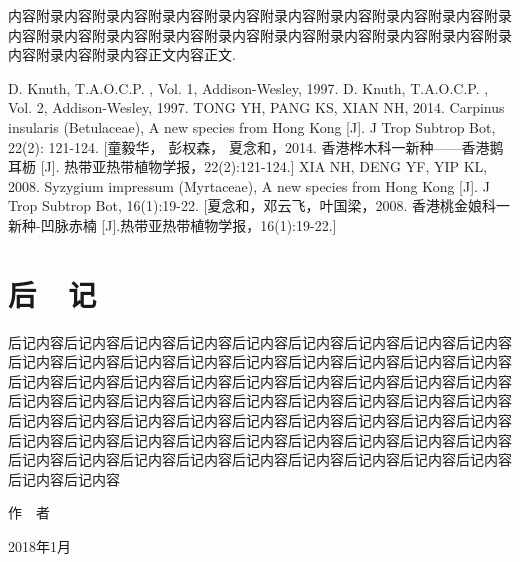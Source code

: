 \documentclass[utf8]{book}
\begin{document}
内容附录内容附录内容附录内容附录内容附录内容附录内容附录内容附录内容附录内容附录内容附录内容附录内容附录内容附录内容附录内容附录内容附录内容附录内容附录内容附录内容正文内容正文\cite{DK1}.

\renewcommand\indexname{索~~引}
\printindex
{}

\backmatter


\begin{thebibliography}{参考文献}
 D. Knuth, T.A.O.C.P. , Vol. 1, Addison-Wesley, 1997.
 D. Knuth, T.A.O.C.P. , Vol. 2, Addison-Wesley, 1997.
 TONG YH, PANG KS, XIAN NH, 2014. Carpinus insularis (Betulaceae), A new species from Hong Kong [J]. J Trop Subtrop Bot, 22(2): 121-124. [童毅华， 彭权森， 夏念和，2014. 香港桦木科一新种——香港鹅耳枥 [J]. 热带亚热带植物学报，22(2):121-124.]
 XIA NH, DENG YF, YIP KL, 2008. Syzygium impressum (Myrtaceae), A new species from Hong Kong [J]. J Trop Subtrop Bot, 16(1):19-22. [夏念和，邓云飞，叶国梁，2008. 香港桃金娘科一新种-凹脉赤楠 [J].热带亚热带植物学报，16(1):19-22.]
\end{thebibliography}

\chapter{后~~记}

后记内容后记内容后记内容后记内容后记内容后记内容后记内容后记内容后记内容后记内容后记内容后记内容后记内容后记内容后记内容后记内容后记内容后记内容后记内容后记内容后记内容后记内容后记内容后记内容后记内容后记内容后记内容后记内容后记内容后记内容后记内容后记内容后记内容后记内容后记内容后记内容后记内容后记内容后记内容后记内容后记内容后记内容后记内容后记内容后记内容后记内容后记内容后记内容后记内容后记内容后记内容后记内容后记内容后记内容后记内容后记内容后记内容后记内容后记内容后记内容后记内容后记内容后记内容后记内容后记内容

\begin{flushright}
作~~者~~~~~~~~~

2018年1月~~~~~
\end{flushright}
\end{document}
